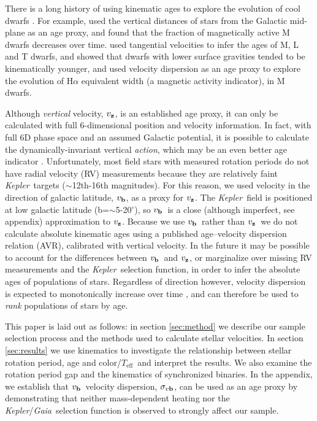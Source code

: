 \documentclass{aastex63}
\newcommand{\eg}{{\it e.g.}}
\newcommand{\kepler}{{\it Kepler}}
\newcommand{\gaia}{{\it Gaia}}
\newcommand{\teff}{$T_{\mathrm{eff}}$}
\newcommand{\degrees}{$^\circ$}
\newcommand{\vz}{$v_{\bf z}$}
\newcommand{\vb}{$v_{\bf b}$}
\newcommand{\sigmavb}{$\sigma_{v{\bf b}}$}
\newcommand{\racomment}[1]{{\color{blue}#1}}
\begin{document}
\racomment{ There is a long history of using kinematic ages to explore the
evolution of cool dwarfs \citep[\eg][]{reid1995, gizis2000, west2004,
west2006, schmidt2007, faherty2009, kiman2019}.
For example, \citet{west2004, west2006} used the vertical distances of stars
from the Galactic mid-plane as an age proxy, and found that the fraction of
magnetically active M dwarfs decreases over time.
\citet{faherty2009} used tangential velocities to infer the ages of M, L and T
dwarfs, and showed that dwarfs with lower surface gravities tended to be
kinematically younger, and \citet{kiman2019} used velocity dispersion as an
age proxy to explore the evolution of H$\alpha$ equivalent width (a magnetic
activity indicator), in M dwarfs.
}

Although {\it vertical} velocity, \vz, is an established age proxy, it can
only be calculated with full 6-dimensional position and velocity information.
In fact, with full 6D phase space and an assumed Galactic potential, it is
possible to calculate the dynamically-invariant vertical {\it action}, which may
be an even better age indicator \citep{beane2018, ting2019}.
Unfortunately, most field stars with measured rotation periods do not have
radial velocity (RV) measurements because they are relatively faint \kepler\
targets ($\sim$12th-16th magnitudes).
For this reason, we used velocity in the direction of galactic latitude, \vb,
as a proxy for \vz.
The \kepler\ field is positioned at low galactic latitude
(b=$\sim$5-20\degrees), so \vb\ is a close (although imperfect, see
appendix) approximation to \vz.
Because we use \vb\ rather than \vz\, we do not calculate absolute kinematic
ages using a published age--velocity dispersion relation (AVR), calibrated with
vertical velocity.
In the future it may be possible to account for the differences between \vb\
and \vz, or marginalize over missing RV measurements and the \kepler\
selection function, in order to infer the absolute ages of populations of
stars.
Regardless of direction however, velocity dispersion is expected to
monotonically increase over time \citep[\eg][]{holmberg2009}, and can
therefore be used to {\it rank} populations of stars by age.

This paper is laid out as follows: in section \ref{sec:method} we describe our
sample selection process and the methods used to calculate stellar
velocities.
In section \ref{sec:results} we use kinematics to investigate the relationship
between stellar rotation period, age and color/\teff\ and interpret the
results.
We also examine the rotation period gap and the kinematics of synchronized
binaries.
In the appendix, we establish that \vb\ velocity dispersion, \sigmavb, can be
used as an age proxy by demonstrating that neither mass-dependent heating nor
the \kepler/\gaia\ selection function is observed to strongly affect our
sample.
\end{document}
